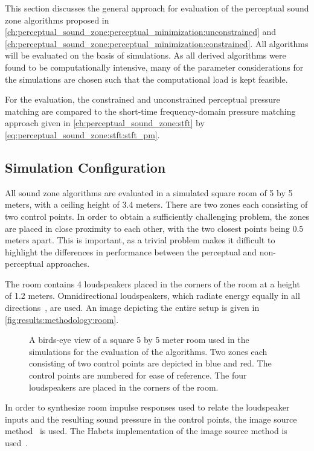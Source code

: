 This section discusses the general approach for evaluation of the perceptual sound zone algorithms proposed in 
\autoref{ch:perceptual_sound_zone:perceptual_minimization:unconstrained} and \autoref{ch:perceptual_sound_zone:perceptual_minimization:constrained}.
All algorithms will be evaluated on the basis of simulations. 
As all derived algorithms were found to be computationally intensive, many of the parameter considerations 
for the simulations are chosen such that the computational load is kept feasible.

For the evaluation, the constrained and unconstrained perceptual pressure matching are compared to the 
short-time frequency-domain pressure matching approach
given in \autoref{ch:perceptual_sound_zone:stft} by \autoref{eq:perceptual_sound_zone:stft:stft_pm}.

\subsection{Simulation Configuration}
\label{ch:results:methodology:configuration}
All sound zone algorithms are evaluated in a simulated square room of 5 by 5 meters, with a ceiling height of 3.4 meters.
There are two zones each consisting of two control points.
In order to obtain a sufficiently challenging problem, the zones are placed in close proximity to each other, 
with the two closest points being 0.5 meters apart.
This is important, as a trivial problem makes it difficult to highlight the differences in performance
between the perceptual and non-perceptual approaches.

The room contains 4 loudspeakers placed in the corners of the room at a height of 1.2 meters.
Omnidirectional loudspeakers, which radiate energy equally in all directions~\cite{habets2006room}, are used.
An image depicting the entire setup is given in \autoref{fig:results:methodology:room}.

\begin{figure}[]
    \centering
    \scalebox{1.0}{}
    \caption{A birds-eye view of a square 5 by 5 meter room used in the simulations for the evaluation of the algorithms.
    Two zones each consisting of two control points are depicted in blue and red.
    The control points are numbered for ease of reference.
    The four loudspeakers are placed in the corners of the room.}
    \label{fig:results:methodology:room}
\end{figure}

In order to synthesize room impulse responses used to relate the loudspeaker inputs and the resulting sound pressure 
in the control points, the image source method~\cite{allen1979image} is used.
The Habets implementation of the image source method is used~\cite{habets2006room}.

